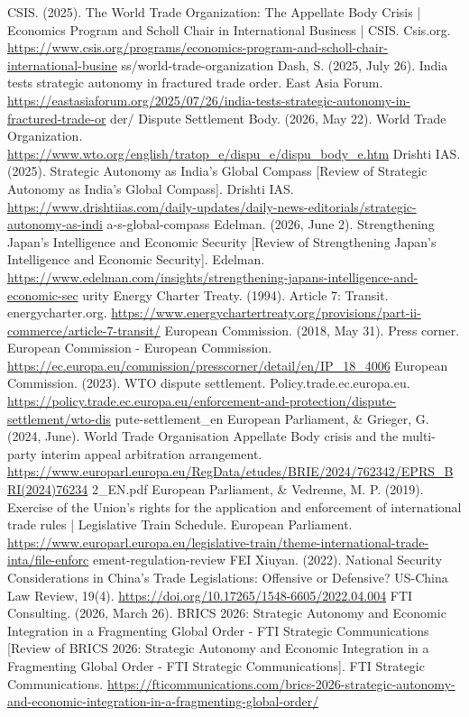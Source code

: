 \begin{referencelist}
   CSIS. (2025). The World Trade Organization: The Appellate Body Crisis | Economics Program and Scholl Chair in International Business | CSIS. Csis.org. \url{https://www.csis.org/programs/economics-program-and-scholl-chair-international-busine} ss/world-trade-organization
   Dash, S. (2025, July 26). India tests strategic autonomy in fractured trade order. East Asia Forum. \url{https://eastasiaforum.org/2025/07/26/india-tests-strategic-autonomy-in-fractured-trade-or} der/ Dispute Settlement Body. (2026, May 22). World Trade Organization. \url{https://www.wto.org/english/tratop_e/dispu_e/dispu_body_e.htm}
   Drishti IAS. (2025). Strategic Autonomy as India’s Global Compass [Review of Strategic Autonomy as India’s Global Compass]. Drishti IAS. \url{https://www.drishtiias.com/daily-updates/daily-news-editorials/strategic-autonomy-as-indi} a-s-global-compass
   Edelman. (2026, June 2). Strengthening Japan’s Intelligence and Economic Security [Review of Strengthening Japan’s Intelligence and Economic Security]. Edelman. \url{https://www.edelman.com/insights/strengthening-japans-intelligence-and-economic-sec} urity
   Energy Charter Treaty. (1994). Article 7: Transit. energycharter.org. \url{https://www.energychartertreaty.org/provisions/part-ii-commerce/article-7-transit/}
   European Commission. (2018, May 31). Press corner. European Commission - European Commission. \url{https://ec.europa.eu/commission/presscorner/detail/en/IP_18_4006}
   European Commission. (2023). WTO dispute settlement. Policy.trade.ec.europa.eu. \url{https://policy.trade.ec.europa.eu/enforcement-and-protection/dispute-settlement/wto-dis} pute-settlement\_en
   European Parliament, \& Grieger, G. (2024, June). World Trade Organisation Appellate Body crisis and the multi-party interim appeal arbitration arrangement. \url{https://www.europarl.europa.eu/RegData/etudes/BRIE/2024/762342/EPRS_BRI(2024)76234} 2\_EN.pdf European Parliament, \& Vedrenne, M.
   P. (2019). Exercise of the Union’s rights for the application and enforcement of international trade rules | Legislative Train Schedule. European Parliament. \url{https://www.europarl.europa.eu/legislative-train/theme-international-trade-inta/file-enforc} ement-regulation-review
   FEI Xiuyan. (2022). National Security Considerations in China’s Trade Legislations: Offensive or Defensive? US-China Law Review, 19(4). \url{https://doi.org/10.17265/1548-6605/2022.04.004}
   FTI Consulting. (2026, March 26). BRICS 2026: Strategic Autonomy and Economic Integration in a Fragmenting Global Order - FTI Strategic Communications [Review of BRICS 2026: Strategic Autonomy and Economic Integration in a Fragmenting Global Order - FTI Strategic Communications]. FTI Strategic Communications. \url{https://fticommunications.com/brics-2026-strategic-autonomy-and-economic-integration-in-a-fragmenting-global-order/}

\end{referencelist}
